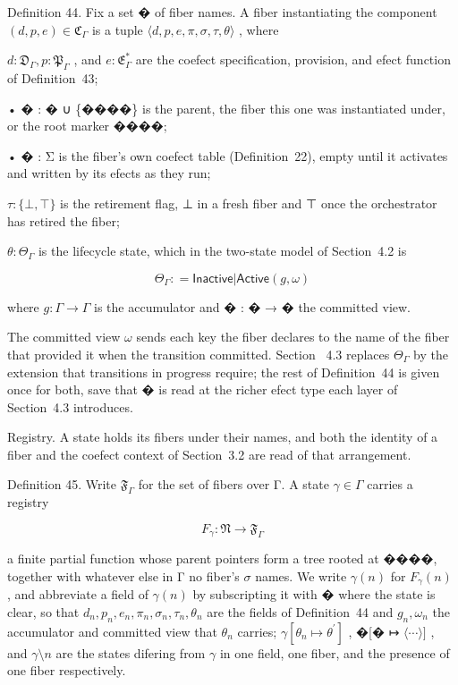 \documentclass[
  10
]{article}
\begin{document}
Definition 44. Fix a set � of fiber names. A fiber instantiating the
component \(( d , p , e ) \in \mathfrak { C } _ { \Gamma }\) is a tuple
\(\langle d , p , e , \pi , \sigma , \tau , \theta \rangle\) , where

\(d : \mathfrak { D } _ { \Gamma } , p : \mathfrak { P } _ { \Gamma }\)
, and \(e : { \mathfrak { E } } _ { \Gamma } ^ { * }\) are the coefect
specification, provision, and efect function of Definition~43;

• � : � ∪ \{����\} is the parent, the fiber this one was instantiated
under, or the root marker ����;

• � : Σ is the fiber's own coefect table (Definition~22), empty until it
activates and written by its efects as they run;

\(\tau : \{ \bot , \top \}\) is the retirement flag, ⊥ in a fresh fiber
and ⊤ once the orchestrator has retired the fiber;

\(\theta : \Theta _ { \Gamma }\) is the lifecycle state, which in the
two-state model of Section~4.2 is

\[
\Theta _ { \Gamma } : = \mathsf { I n a c t i v e } | \mathsf { A c t i v e } ( g , \omega )\tag{38}
\]

where \(g : \Gamma \to \Gamma\) is the accumulator and � : � → � the
committed view.

The committed view \(\omega\) sends each key the fiber declares to the
name of the fiber that provided it when the transition committed.
Section~ 4.3 replaces \(\Theta _ { \Gamma }\) by the extension that
transitions in progress require; the rest of Definition~44 is given once
for both, save that � is read at the richer efect type each layer of
Section~4.3 introduces.

Registry. A state holds its fibers under their names, and both the
identity of a fiber and the coefect context of Section~3.2 are read of
that arrangement.

Definition 45. Write \(\mathfrak { F } _ { \Gamma }\) for the set of
fibers over Γ. A state \(\gamma \in \Gamma\) carries a registry

\[
F _ { \gamma } : \mathfrak { N } \to \mathfrak { F } _ { \Gamma }\tag{39}
\]

a finite partial function whose parent pointers form a tree rooted at
����, together with whatever else in Γ no fiber's \(\sigma\) names. We
write \(\gamma ( n )\) for \(F _ { \gamma } ( n )\) , and abbreviate a
field of \(\gamma ( n )\) by subscripting it with � where the state is
clear, so that
\(d _ { n } , p _ { n } , e _ { n } , \pi _ { n } , \sigma _ { n } , \tau _ { n } , \theta _ { n }\)
are the fields of Definition~44 and \(g _ { n } , \omega _ { n }\) the
accumulator and committed view that \(\theta _ { n }\) carries;
\(\gamma [ \theta _ { n } \mapsto \theta ^ { \prime } ]\) , �{[}� ↦
\(\langle \cdots \rangle ]\) , and \(\gamma \setminus n\) are the states
difering from \(\gamma\) in one field, one fiber, and the presence of
one fiber respectively.
\end{document}
